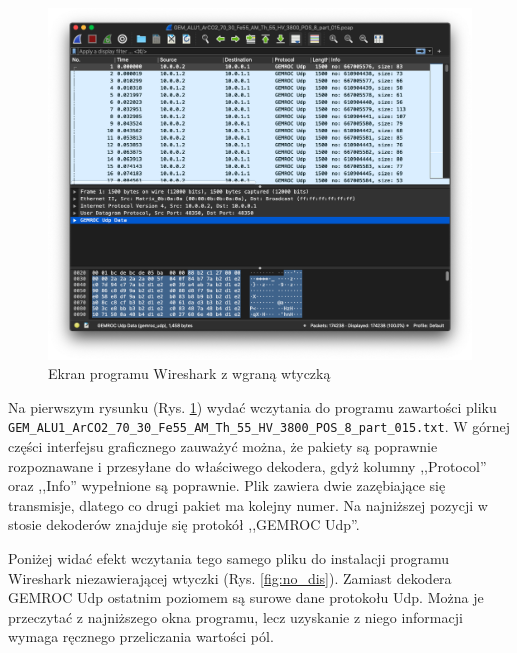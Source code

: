 \documentclass[a4paper, 12pt, twoside, openright]{article}
\begin{document}
		\begin{figure}[H]
			\centering
				\includegraphics[width=1.0\textwidth]{img/screenshot_dissector.png}
			\caption{Ekran programu Wireshark z wgraną wtyczką}
			\label{fig:dis}
		\end{figure}

	Na pierwszym rysunku (Rys. \ref{fig:dis}) wydać wczytania do programu zawartości pliku
	\texttt{GEM\_ALU1\_ArCO2\_70\_30\_Fe55\_AM\_Th\_55\_HV\_3800\_POS\_8\_part\_015.txt}.
	W górnej części interfejsu graficznego zauważyć można, że pakiety są poprawnie rozpoznawane i przesyłane do właściwego dekodera, gdyż
	kolumny ,,Protocol'' oraz ,,Info'' wypełnione są poprawnie. Plik zawiera dwie zazębiające się transmisje, dlatego co drugi pakiet ma kolejny numer.
	Na najniższej pozycji w stosie dekoderów znajduje się protokół ,,GEMROC Udp''.

	Poniżej widać efekt wczytania tego samego pliku do instalacji programu Wireshark niezawierającej wtyczki (Rys. \ref{fig:no_dis}).
	Zamiast dekodera GEMROC Udp ostatnim poziomem są surowe dane protokołu Udp. Można je przeczytać z najniższego okna programu,
	lecz uzyskanie z niego informacji wymaga ręcznego przeliczania wartości pól.
\end{document}
